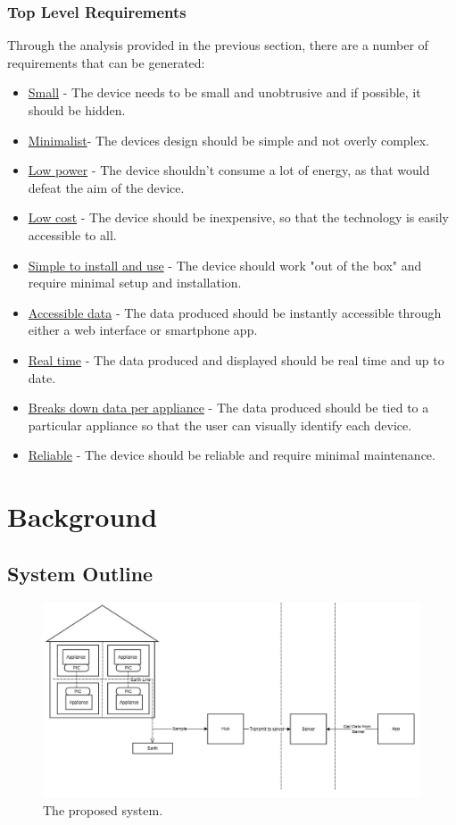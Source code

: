 \documentclass[preprint,12pt,3p]{elsarticle}
\begin{document}
\subsubsection{Top Level Requirements}

Through the analysis provided in the previous section, there are a number of requirements that can be generated:

\begin{itemize}
  \item \underline{Small} - The device needs to be small and unobtrusive and if possible, it should be hidden.
  \item \underline{Minimalist}- The devices design should be simple and not overly complex.
  \item \underline{Low power} - The device shouldn't consume a lot of energy, as that would defeat the aim of the device.
  \item \underline{Low cost} - The device should be inexpensive, so that the technology is easily accessible to all.
  \item \underline{Simple to install and use} - The device should work "out of the box" and require minimal setup and installation.
  \item \underline{Accessible data}  - The data produced should be instantly accessible through either a web interface or smartphone app.
  \item \underline{Real time} - The data produced and displayed should be real time and up to date.
  \item \underline{Breaks down data per appliance} - The data produced should be tied to a particular appliance so that the user can visually identify each device.
  \item \underline{Reliable} - The device should be reliable and require minimal maintenance.
\end{itemize}

\section{Background}
\subsection{System Outline}
\begin{figure}[H]
    \centering
    \includegraphics[width=\columnwidth]{diagrams/overalldescript}
    \caption {The proposed system.}
\end{figure}
\end{document}
